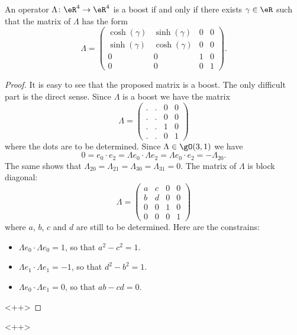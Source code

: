 \begin{lemma}
    An operator \( \Lambda\colon \eR^4\to \eR^4\) is a boost if and only if there exists \( \gamma\in \eR\) such that the matrix of \( \Lambda\) has the form 
    \begin{equation}
        \Lambda=\begin{pmatrix}
             \cosh(\gamma)   &   \sinh(\gamma)    &   0    &   0    \\
             \sinh(\gamma)   &   \cosh(\gamma)    &   0    &   0    \\
             0   &   0    &   1    &   0    \\ 
             0   &   0    &   0    &   1     
         \end{pmatrix}.
    \end{equation}
\end{lemma}

\begin{proof}
    It is easy to see that the proposed matrix is a boost. The only difficult part is the direct sense. Since \( \Lambda\) is a boost we have the matrix
    \begin{equation}
        \Lambda=\begin{pmatrix}
             .   &   .    &   0    &   0    \\
             .   &   .    &   0    &   0    \\
             .   &   .    &   1    &   0    \\ 
             .   &   .    &   0    &   1     
         \end{pmatrix}
    \end{equation}
    where the dots are to be determined. Since \( \Lambda\in\gO(3,1)\) we have
    \begin{equation}
        0=e_0\cdot e_2=\Lambda e_0\cdot \Lambda e_2=\Lambda e_0\cdot e_2=-\Lambda_{20}.
    \end{equation}
    The same shows that \( \Lambda_{20}=\Lambda_{21}=\Lambda_{30}=\Lambda_{31}=0\). The matrix of \( \Lambda\) is block diagonal:
    \begin{equation}
        \Lambda=\begin{pmatrix}
             a   &   c    &   0    &   0    \\
             b   &   d    &   0    &   0    \\
             0   &   0    &   1    &   0    \\ 
             0   &   0    &   0    &   1     
         \end{pmatrix}
    \end{equation}
    where \( a\), \( b\), \( c\) and \( d\) are still to be determined. Here are the constrains:
    \begin{itemize}
        \item \( \Lambda e_0\cdot \Lambda e_0=1\), so that \( a^2-c^2=1\).
        \item \( \Lambda e_1\cdot \Lambda e_1=-1\), so that \( d^2-b^2=1\).
        \item \( \Lambda e_0\cdot \Lambda e_1=0\), so that \( ab-cd=0\).
    \end{itemize}
    <++>
\end{proof}
<++>

